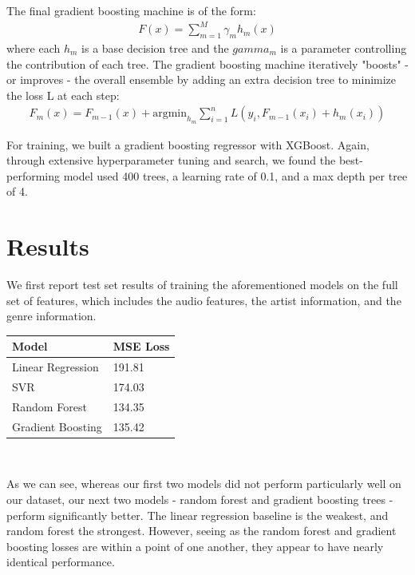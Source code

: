 \documentclass[journal]{IEEEtran}
\begin{document}
The final gradient boosting machine is of the form: \begin{align*}
    F(x) = \sum_{m=1}^{M}\gamma_m h_m(x)
\end{align*}
where each $h_m$ is a base decision tree and the $gamma_m$ is a parameter controlling the contribution of each tree. The gradient boosting machine iteratively "boosts" - or improves - the overall ensemble by adding an extra decision tree to minimize the loss L at each step: \begin{align*}
    F_m(x) = F_{m-1}(x) + \text{argmin}_{h_m} \sum_{i=1}^{n} L(y_i, F_{m-1}(x_i)+h_m(x_i))
\end{align*}

For training, we built a gradient boosting regressor with XGBoost. Again, through extensive hyperparameter tuning and search, we found the best-performing model used 400 trees, a learning rate of 0.1, and a max depth per tree of 4. \\

\section{Results}

We first report test set results of training the aforementioned models on the full set of features, which includes the audio features, the artist information, and the genre information. \\

\begin{center}
\begin{tabular}{|l|l|}
\hline
\textbf{Model} & \textbf{MSE Loss} \\ \hline
Linear Regression  & 191.81                 \\ \hline
SVR                & 174.03                 \\ \hline
Random Forest      & 134.35                 \\ \hline
Gradient Boosting  & 135.42                  \\ \hline
\end{tabular} \\
\end{center}

\quad\newline
As we can see, whereas our first two models did not perform particularly well on our dataset, our next two models - random forest and gradient boosting trees - perform significantly better. The linear regression baseline is the weakest, and random forest the strongest. However, seeing as the random forest and gradient boosting losses are within a point of one another, they appear to have nearly identical performance.
\end{document}

